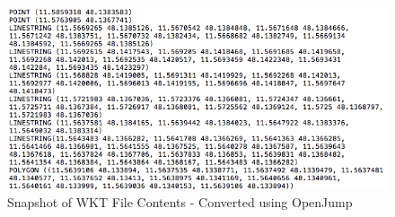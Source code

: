 	\begin{figure}[h]
		\centering
		\includegraphics[scale=0.55]{./figures/wkt-file-2}
		\caption{Snapshot of WKT File Contents - Converted using OpenJump \cite{openjump} }
	\end{figure}

